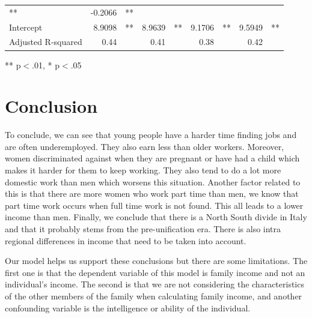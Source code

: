 \documentclass[12pt]{article}
\begin{document}
\begin{table}[!h]
\begin{tabular}{lllllllll}
  \multicolumn{1}{l}{**} &
  \multicolumn{1}{r}{-0.2066} &
  \multicolumn{1}{l}{**} \\
\multicolumn{1}{l}{Intercept} &
  \multicolumn{1}{r}{8.9098} &
  \multicolumn{1}{l}{**} &
  \multicolumn{1}{r}{8.9639} &
  \multicolumn{1}{l}{**} &
  \multicolumn{1}{r}{9.1706} &
  \multicolumn{1}{l}{**} &
  \multicolumn{1}{r}{9.5949} &
  \multicolumn{1}{l}{**} \\
\multicolumn{1}{l}{Adjusted R-squared} &
  \multicolumn{1}{r}{0.44} &
  \multicolumn{1}{l}{} &
  \multicolumn{1}{r}{0.41} &
  \multicolumn{1}{l}{} &
  \multicolumn{1}{r}{0.38} &
  \multicolumn{1}{l}{} &
  \multicolumn{1}{r}{0.42} &
  \multicolumn{1}{l}{} \\
\cline{1-9}
\end{tabular}

\footnotesize{
** p$<$.01, * p$<$.05
}
\end{table}

\section{Conclusion}

\begin{spacing}{1.5}
To conclude, we can see that young people have a harder time finding jobs and are often underemployed. They also earn less than older workers. Moreover, women discriminated against when they are pregnant or have had a child which makes it harder for them to keep working. They also tend to do a lot more domestic work than men which worsens this situation. Another factor related to this is that there are more women who work part time than men, we know that part time work occurs when full time work is not found. This all leads to a lower income than men. Finally, we conclude that there is a North South divide in Italy and that it probably stems from the pre-unification era. There is also intra regional differences in income that need to be taken into account.

Our model helps us support these conclusions but there are some limitations. The first one is that the dependent variable of this model is family income and not an individual's income. The second is that we are not considering the characteristics of the other members of the family when calculating family income, and another confounding variable is the intelligence or ability of the individual.

\end{spacing}

\clearpage


\end{document}
